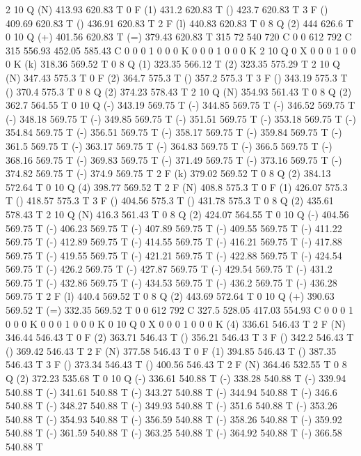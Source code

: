 2 10 Q
(N) 413.93 620.83 T
0 F
(1) 431.2 620.83 T
() 423.7 620.83 T
3 F
() 409.69 620.83 T
() 436.91 620.83 T
2 F
(l) 440.83 620.83 T
0 8 Q
(2) 444 626.6 T
0 10 Q
(+) 401.56 620.83 T
(=) 379.43 620.83 T
315 72 540 720 C
0 0 612 792 C
315 556.93 452.05 585.43 C
0 0 0 1 0 0 0 K
0 0 0 1 0 0 0 K
2 10 Q
0 X
0 0 0 1 0 0 0 K
(k) 318.36 569.52 T
0 8 Q
(1) 323.35 566.12 T
(2) 323.35 575.29 T
2 10 Q
(N) 347.43 575.3 T
0 F
(2) 364.7 575.3 T
() 357.2 575.3 T
3 F
() 343.19 575.3 T
() 370.4 575.3 T
0 8 Q
(2) 374.23 578.43 T
2 10 Q
(N) 354.93 561.43 T
0 8 Q
(2) 362.7 564.55 T
0 10 Q
(-) 343.19 569.75 T
(-) 344.85 569.75 T
(-) 346.52 569.75 T
(-) 348.18 569.75 T
(-) 349.85 569.75 T
(-) 351.51 569.75 T
(-) 353.18 569.75 T
(-) 354.84 569.75 T
(-) 356.51 569.75 T
(-) 358.17 569.75 T
(-) 359.84 569.75 T
(-) 361.5 569.75 T
(-) 363.17 569.75 T
(-) 364.83 569.75 T
(-) 366.5 569.75 T
(-) 368.16 569.75 T
(-) 369.83 569.75 T
(-) 371.49 569.75 T
(-) 373.16 569.75 T
(-) 374.82 569.75 T
(-) 374.9 569.75 T
2 F
(k) 379.02 569.52 T
0 8 Q
(2) 384.13 572.64 T
0 10 Q
(4) 398.77 569.52 T
2 F
(N) 408.8 575.3 T
0 F
(1) 426.07 575.3 T
() 418.57 575.3 T
3 F
() 404.56 575.3 T
() 431.78 575.3 T
0 8 Q
(2) 435.61 578.43 T
2 10 Q
(N) 416.3 561.43 T
0 8 Q
(2) 424.07 564.55 T
0 10 Q
(-) 404.56 569.75 T
(-) 406.23 569.75 T
(-) 407.89 569.75 T
(-) 409.55 569.75 T
(-) 411.22 569.75 T
(-) 412.89 569.75 T
(-) 414.55 569.75 T
(-) 416.21 569.75 T
(-) 417.88 569.75 T
(-) 419.55 569.75 T
(-) 421.21 569.75 T
(-) 422.88 569.75 T
(-) 424.54 569.75 T
(-) 426.2 569.75 T
(-) 427.87 569.75 T
(-) 429.54 569.75 T
(-) 431.2 569.75 T
(-) 432.86 569.75 T
(-) 434.53 569.75 T
(-) 436.2 569.75 T
(-) 436.28 569.75 T
2 F
(l) 440.4 569.52 T
0 8 Q
(2) 443.69 572.64 T
0 10 Q
(+) 390.63 569.52 T
(=) 332.35 569.52 T
0 0 612 792 C
327.5 528.05 417.03 554.93 C
0 0 0 1 0 0 0 K
0 0 0 1 0 0 0 K
0 10 Q
0 X
0 0 0 1 0 0 0 K
(4) 336.61 546.43 T
2 F
(N) 346.44 546.43 T
0 F
(2) 363.71 546.43 T
() 356.21 546.43 T
3 F
() 342.2 546.43 T
() 369.42 546.43 T
2 F
(N) 377.58 546.43 T
0 F
(1) 394.85 546.43 T
() 387.35 546.43 T
3 F
() 373.34 546.43 T
() 400.56 546.43 T
2 F
(N) 364.46 532.55 T
0 8 Q
(2) 372.23 535.68 T
0 10 Q
(-) 336.61 540.88 T
(-) 338.28 540.88 T
(-) 339.94 540.88 T
(-) 341.61 540.88 T
(-) 343.27 540.88 T
(-) 344.94 540.88 T
(-) 346.6 540.88 T
(-) 348.27 540.88 T
(-) 349.93 540.88 T
(-) 351.6 540.88 T
(-) 353.26 540.88 T
(-) 354.93 540.88 T
(-) 356.59 540.88 T
(-) 358.26 540.88 T
(-) 359.92 540.88 T
(-) 361.59 540.88 T
(-) 363.25 540.88 T
(-) 364.92 540.88 T
(-) 366.58 540.88 T
